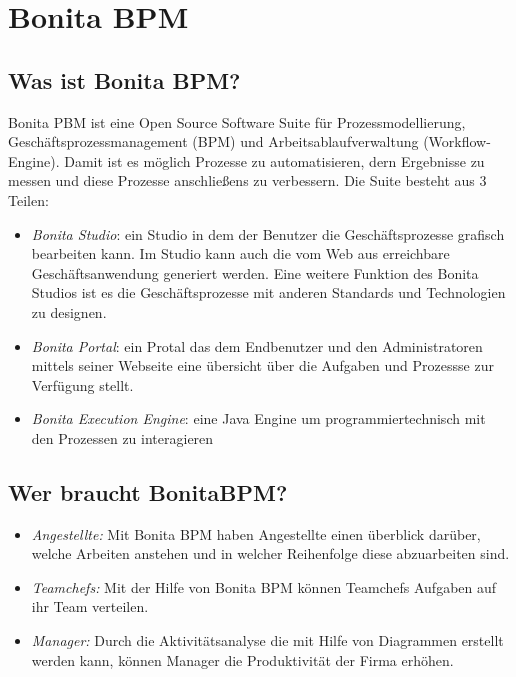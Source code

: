\section{Bonita BPM}
\subsection{Was ist Bonita BPM?}
Bonita PBM ist eine Open Source Software Suite f\"ur Prozessmodellierung,  Gesch\"aftsprozessmanagement (BPM) und Arbeitsablaufverwaltung (Workflow-Engine).  Damit ist es m\"oglich Prozesse zu automatisieren, dern Ergebnisse zu messen und diese Prozesse anschlie{\ss}ens zu verbessern. Die Suite besteht aus 3 Teilen: 
\begin{itemize}
 \item{\textit{Bonita Studio}: ein Studio in dem der Benutzer die Gesch\"aftsprozesse grafisch bearbeiten kann. Im Studio kann auch die vom Web aus erreichbare Gesch\"aftsanwendung generiert werden. Eine weitere Funktion des Bonita Studios ist es die Gesch\"aftsprozesse mit anderen Standards und Technologien zu designen.}
 \item{\textit{Bonita Portal}: ein Protal das dem Endbenutzer und den Administratoren mittels seiner Webseite eine \"ubersicht \"uber die Aufgaben und Prozessse zur Verf\"ugung stellt.}
 \item{\textit{Bonita Execution Engine}: eine Java Engine um programmiertechnisch mit den Prozessen zu interagieren}
\end{itemize}

\subsection{Wer braucht BonitaBPM?}
\begin{itemize}
\item{\textit{Angestellte:} Mit Bonita BPM haben Angestellte einen \"uberblick dar\"uber, welche Arbeiten anstehen und in welcher Reihenfolge diese abzuarbeiten sind.}
\item{\textit{Teamchefs:} Mit der Hilfe von Bonita BPM k\"onnen Teamchefs Aufgaben auf ihr Team verteilen.}
\item{\textit{Manager:} Durch die Aktivit\"atsanalyse die mit Hilfe von Diagrammen erstellt werden kann, k\"onnen Manager die Produktivit\"at der Firma erh\"ohen.}
\end{itemize}
